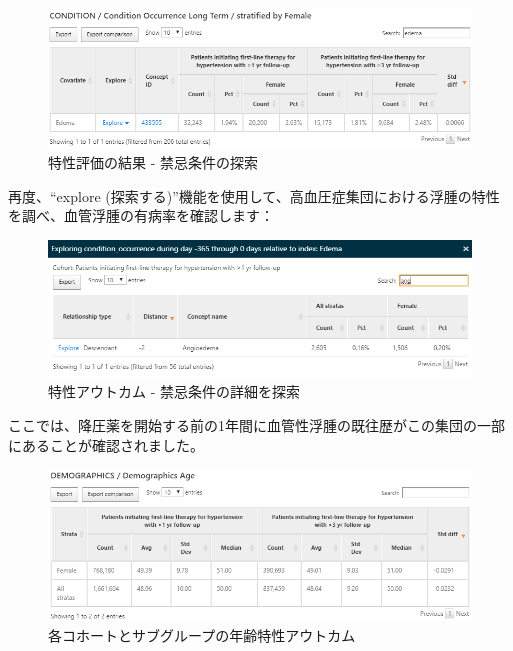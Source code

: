 \documentclass[
  11pt]{book}
\theoremstyle{definition}
\theoremstyle{definition}
\theoremstyle{definition}
\theoremstyle{definition}
\theoremstyle{remark}
\begin{document}
\begin{figure}

{\centering \includegraphics[width=1\linewidth]{images/Characterization/atlasCharacterizationResultsContra} 

}

\caption{特性評価の結果 - 禁忌条件の探索}\label{fig:atlasCharacterizationResultsContra}
\end{figure}

再度、``explore (探索する)''機能を使用して、高血圧症集団における浮腫の特性を調べ、血管浮腫の有病率を確認します：

\begin{figure}

{\centering \includegraphics[width=1\linewidth]{images/Characterization/atlasCharacterizationResultsContraExplore} 

}

\caption{特性アウトカム - 禁忌条件の詳細を探索}\label{fig:atlasCharacterizationResultsContraExplore}
\end{figure}

ここでは、降圧薬を開始する前の1年間に血管性浮腫の既往歴がこの集団の一部にあることが確認されました。

\begin{figure}

{\centering \includegraphics[width=1\linewidth]{images/Characterization/atlasCharacterizationResultsContinuous} 

}

\caption{各コホートとサブグループの年齢特性アウトカム}\label{fig:atlasCharacterizationResultsContinuous}
\end{figure}
\end{document}
